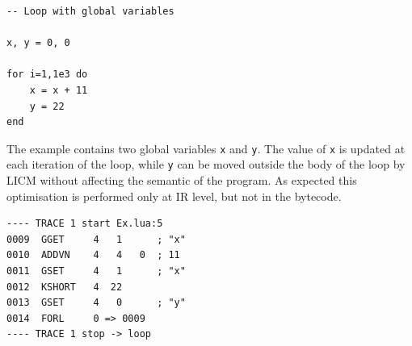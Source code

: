 \begin{mdframed}[style=LuaStyleFrame]
\begin{lstlisting}[style=LuaStyle]
-- Loop with global variables

x, y = 0, 0

for i=1,1e3 do
	x = x + 11
	y = 22
end
\end{lstlisting}
\end{mdframed}

\noindent
The example contains two global variables \texttt{x} and \texttt{y}. The value of \texttt{x} is updated at each iteration of the loop, while \texttt{y} can be moved outside the body of the loop by LICM without affecting the semantic of the program. As expected this optimisation is performed only at IR level, but not in the bytecode.

\begin{multicols}{2}
\begin{lstlisting}[style=DumpStyle]
---- TRACE 1 start Ex.lua:5
0009  GGET     4   1      ; "x"
0010  ADDVN    4   4   0  ; 11
0011  GSET     4   1      ; "x"
0012  KSHORT   4  22
0013  GSET     4   0      ; "y"
0014  FORL     0 => 0009
---- TRACE 1 stop -> loop
\end{lstlisting}
\end{multicols}

